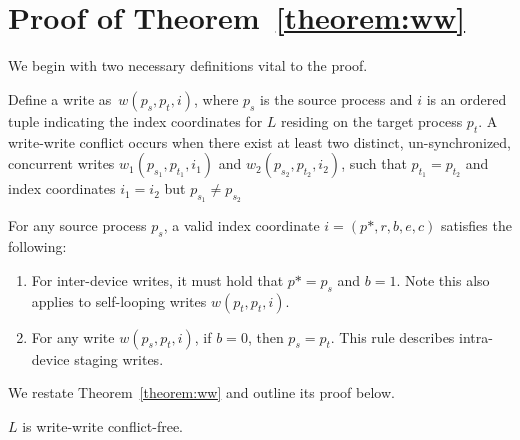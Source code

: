 \section{Proof of Theorem~\ref{theorem:ww}}\label{sec:proof-of-theorem}
We begin with two necessary definitions vital to the proof.
\begin{definition}
    Define a write as~$w(p_s, p_t, i)$, where $p_s$ is the source process and $i$ is an ordered tuple
    indicating the index coordinates for $L$ residing on the target process $p_t$.
    A write-write conflict occurs when there exist at least two distinct, un-synchronized, concurrent writes
    $w_1(p_{s_1}, p_{t_1}, i_1)$ and $w_2(p_{s_2}, p_{t_2}, i_2)$, such that
    $p_{t_1} = p_{t_2}$ and index coordinates $i_1 = i_2$ but $p_{s_1} \neq p_{s_2}$
\end{definition}
\begin{definition}
    For any source process $p_s$, a valid index coordinate $i = (p*, r, b, e, c)$ satisfies the following:
    \begin{enumerate}
        \item For inter-device writes, it must hold that $p* = p_s$ and $b = 1$.
        Note this also applies to self-looping writes $w(p_t, p_t, i)$.
        \item For any write $w(p_s, p_t, i)$, if $b = 0$, then $p_s = p_t$.
        This rule describes intra-device staging writes.
    \end{enumerate}
\end{definition}
We restate Theorem~\ref{theorem:ww} and outline its proof below.
\begin{theorem}\label{theorem:ww2}
$L$ is write-write conflict-free.
\end{theorem}
